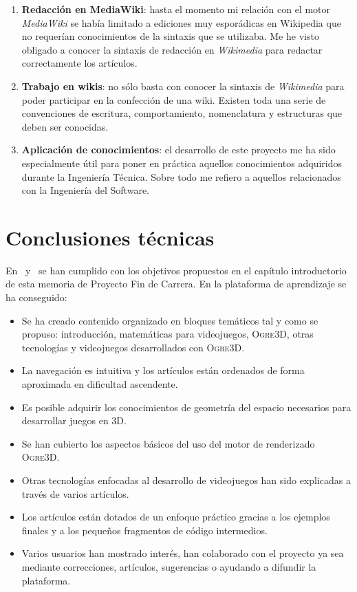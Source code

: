 \begin{enumerate}
    \item \textbf{Redacción en MediaWiki}: hasta el momento mi relación
    con el motor \textit{MediaWiki} se había limitado a ediciones muy
    esporádicas en Wikipedia que no requerían conocimientos de la sintaxis
    que se utilizaba. Me he visto obligado a conocer la sintaxis de redacción
    en \textit{Wikimedia} para redactar correctamente los artículos.\\
    
    \item \textbf{Trabajo en wikis}: no sólo basta con conocer la sintaxis
    de \textit{Wikimedia} para poder participar en la confección de una wiki.
    Existen toda una serie de convenciones de escritura, comportamiento,
    nomenclatura y estructuras que deben ser conocidas.\\
    
    \item \textbf{Aplicación de conocimientos}: el desarrollo de este
    proyecto me ha sido especialmente útil para poner en práctica aquellos
    conocimientos adquiridos durante la Ingeniería Técnica. Sobre todo
    me refiero a aquellos relacionados con la Ingeniería del Software.\\
\end{enumerate}

\section{Conclusiones técnicas}

En \wiki\ y \juego\ se han cumplido con los objetivos propuestos en el
capítulo introductorio de esta memoria de Proyecto Fin de Carrera. En la
plataforma de aprendizaje se ha conseguido:

\begin{itemize}
    \itemsep0em
    \item Se ha creado contenido organizado en bloques temáticos tal y como
    se propuso: introducción, matemáticas para videojuegos, \textsc{Ogre3D},
    otras tecnologías y videojuegos desarrollados con \textsc{Ogre3D}.
    \item La navegación es intuitiva y los artículos están ordenados
    de forma aproximada en dificultad ascendente.
    \item Es posible adquirir los conocimientos de geometría del espacio
    necesarios para desarrollar juegos en 3D.
    \item Se han cubierto los aspectos básicos del uso del motor de renderizado
    \textsc{Ogre3D}.
    \item Otras tecnologías enfocadas al desarrollo de videojuegos han sido
    explicadas a través de varios artículos.
    \item Los artículos están dotados de un enfoque práctico gracias a los
    ejemplos finales y a los pequeños fragmentos de código intermedios.
    \item Varios usuarios han mostrado interés, han colaborado con el proyecto
    ya sea mediante correcciones, artículos, sugerencias o ayudando a difundir
    la plataforma.
\end{itemize}

